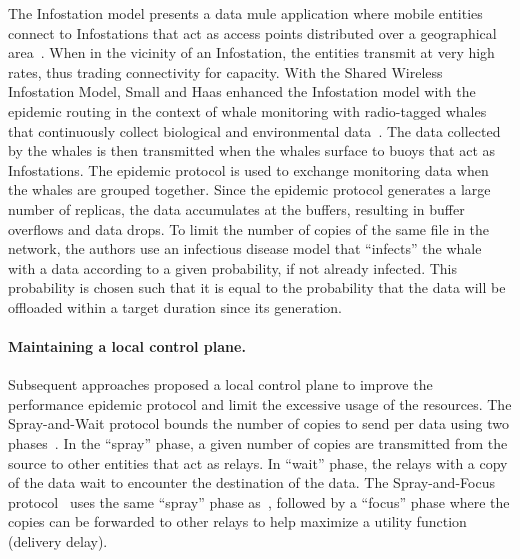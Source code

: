 The Infostation model presents a data \acrshort{mule} application where mobile entities connect to Infostations that act as access points distributed over a geographical area~\cite{goodman1997infostations}. When in the vicinity of an Infostation, the entities transmit at very high rates, thus trading connectivity for capacity. With the Shared Wireless Infostation Model, Small and Haas enhanced the Infostation model with the epidemic routing in the context of whale monitoring with radio-tagged whales that continuously collect biological and environmental data~\cite{small2003shared}. The data collected by the whales is then transmitted when the whales surface to buoys that act as Infostations. The epidemic protocol is used to exchange monitoring data when the whales are grouped together. Since the epidemic protocol generates a large number of replicas, the data accumulates at the buffers, resulting in buffer overflows and data drops. To limit the number of copies of the same file in the network, the authors use an infectious disease model that ``infects'' the whale with a data according to a given probability, if not already infected. This probability is chosen such that it is equal to the probability that the data will be offloaded within a target duration since its generation. 

\paragraph{Maintaining a local control plane.}
Subsequent approaches proposed a local control plane to improve the performance epidemic protocol and limit the excessive usage of the resources. The Spray-and-Wait protocol bounds the number of copies to send per data using two phases~\cite{spyropoulos2005spray}. In the ``spray'' phase, a given number of copies are transmitted from the source to other entities that act as relays. In ``wait'' phase, the relays with a copy of the data wait to encounter the destination of the data. The Spray-and-Focus protocol~\cite{spyropoulos2007spray} uses the same ``spray'' phase as~\cite{spyropoulos2005spray}, followed by a ``focus'' phase where the copies can be forwarded to other relays to help maximize a utility function (\eg delivery delay).

